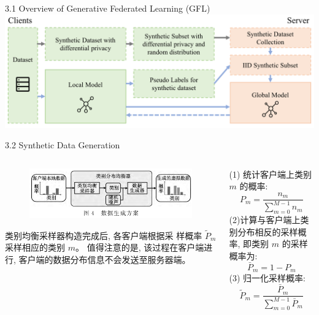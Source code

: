 \documentclass{sintefbeamer}
\theoremstyle{definition}
\begin{document}
\begin{frame}{3.1  Overview of Generative Federated Learning (GFL)}
\centering
\includegraphics[width=1\textwidth]{images/gfl_overview}

\end{frame}

	


\begin{frame}{3.2 Synthetic Data Generation}


\begin{columns}
\begin{column}{0.5\textwidth}
\begin{figure}[ht]
\centering
\includegraphics[width=1\textwidth]{images/img_gan}
\end{figure}

类别均衡采样器构造完成后, 各客户端根据采 样概率 $\widetilde{P}_m$ 采样相应的类别 $m$。 值得注意的是, 该过程在客户端进行, 客户端的数据分布信息不会发送至服务器端。
\end{column}
\begin{column}{0.5\textwidth}
(1) 统计客户端上类别 $m$ 的概率:
$$
P_m=\frac{n_m}{\sum_{m=0}^{M-1} n_m}
$$
(2)计算与客户端上类别分布相反的采样概率, 即类别 $m$ 的采样概率为:
$$
\bar{P}_m=1-P_m
$$
(3) 归一化采样概率:
$$
\widetilde{P}_m=\frac{\bar{P}_m}{\sum_{m=0}^{M-1} \bar{P}_m}
$$
\end{column}
\end{columns}


\end{frame}
\end{document}
